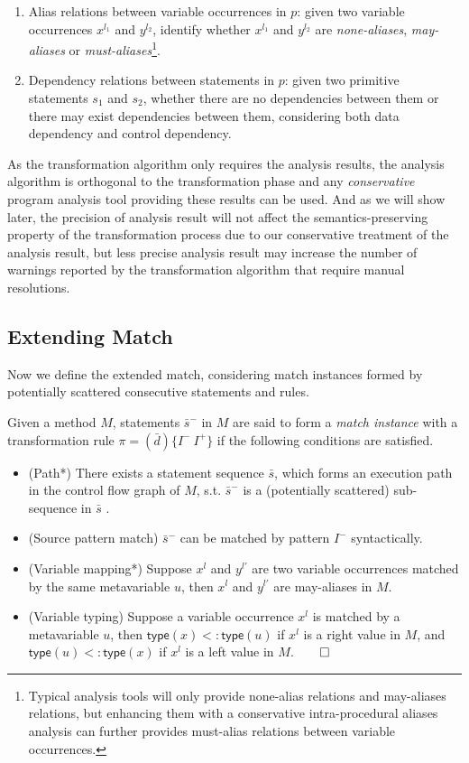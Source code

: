 \documentclass[a4paper, USenglish]{lipics-v2016}
\theoremstyle{plain}
\begin{document}
\begin{enumerate}\itemsep0pt
\item Alias relations between variable occurrences in $p$: given two variable occurrences $x^{l_1}$ and $y^{l_2}$, identify whether $x^{l_1}$ and $y^{l_2}$ are \textit{none-aliases}, \textit{may-aliases} or \textit{must-aliases}\footnote{Typical analysis tools will only provide none-alias relations and may-aliases relations, but enhancing them with a conservative intra-procedural aliases analysis can further provides must-alias relations between variable occurrences.}.
\item Dependency relations between statements in $p$: given two primitive statements $s_1$ and $s_2$, whether there are no dependencies between them or there may exist dependencies between them, considering both data dependency and control dependency.
\end{enumerate}
As the transformation algorithm only requires the analysis results, the analysis algorithm is orthogonal to the transformation phase and any \textit{conservative} program analysis tool providing these results can be used. And as we will show later, the precision of analysis result will not affect the semantics-preserving property of the transformation process due to our conservative treatment of the analysis result, but less precise analysis result may increase the number of warnings reported by the transformation algorithm that require manual resolutions.

\subsection{Extending Match}

Now we define the extended match, considering match instances formed by potentially scattered consecutive statements and rules.

\begin{definition}[Match*]
\label{def:match*}
Given a method $M$, statements $\bar{s}^{-}$ in $M$ are said to form a \emph{match instance} with a transformation rule $\pi=(\bar{d})\{I^{-}~I^+\}$ if the following conditions are satisfied.
\begin{itemize}
\item (Path*) There exists a statement sequence $\bar{s}$, which forms
  an execution path in the control flow graph of $M$, s.t.
  $\bar{s}^{-}$ is a (potentially scattered) sub-sequence in $\bar{s}$ .
\item (Source pattern match) $\bar{s}^{-}$ can be matched by pattern $I^{-}$ syntactically.
\item (Variable mapping*) Suppose $x^l$ and $y^{l'}$ are two variable
  occurrences matched by the same metavariable $u$, then $x^l$ and
  $y^{l'}$ are may-aliases in $M$.
\item (Variable typing) Suppose a variable occurrence $x^l$ is matched by a metavariable $u$, then $\mathsf{type}(x)<:\mathsf{type}(u)$ if $x^l$ is a right value in $M$, and $\mathsf{type}(u)<:\mathsf{type}(x)$ if $x^l$ is a left value in $M$.\hfill $\qed$ 
\end{itemize}
\end{definition}
\end{document}
